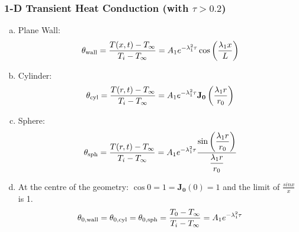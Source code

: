 \documentclass[10pt,compress,unknownkeysallowed]{beamer}
\begin{document}
\begin{frame}
 \frametitle{1-D Transient Heat Conduction (with $\tau > 0.2$)}
   \begin{enumerate}[(a)]%
     \item<1-> Plane Wall:
        \begin{equation}
           \theta_{\text{wall}} = \displaystyle\frac{T(x,t)-T_{\infty}}{T_{i}-T_{\infty}}= A_{1}e^{-\lambda_{1}^{2}\tau}\cos{\left(\displaystyle\frac{\lambda_{1}x}{L}\right)}\label{analytical:wall}
        \end{equation}
     \item<2-> Cylinder:
        \begin{equation}
           \theta_{\text{cyl}} = \displaystyle\frac{T(r,t)-T_{\infty}}{T_{i}-T_{\infty}}= A_{1}e^{-\lambda_{1}^{2}\tau}\mathbf{J_{0}}\left(\displaystyle\frac{\lambda_{1}r}{r_{0}}\right)\label{analytical:cylinder}
        \end{equation}
     \item<3-> Sphere:
        \begin{equation}
           \theta_{\text{sph}} = \displaystyle\frac{T(r,t)-T_{\infty}}{T_{i}-T_{\infty}}= A_{1}e^{-\lambda_{1}^{2}\tau}\displaystyle\frac{\sin{\left(\displaystyle\frac{\lambda_{1}r}{r_{0}}\right)}}{\displaystyle\frac{\lambda_{1}r}{r_{0}}}\label{analytical:sphere}
        \end{equation}

     \item<4-> At the centre of the geometry: $\cos{0}=1=\mathbf{J_{0}}(0)=1$ and the limit of $\frac{sin{x}}{x}$ is 1.
         \begin{equation}
             \theta_{0,\text{wall}} = \theta_{0,\text{cyl}} = \theta_{0,\text{sph}} = \displaystyle\frac{T_{0}-T_{\infty}}{T_{i}-T_{\infty}} = A_{1}e^{-\lambda_{1}^{2}\tau}
         \end{equation}
   \end{enumerate} 

\end{frame}
\end{document}

